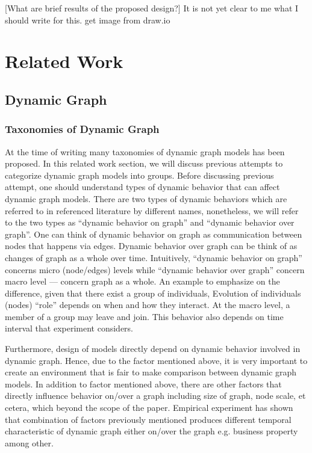 \documentclass{IEEEtran}
\begin{document}
[What are brief results of the proposed design?] It is not yet clear to me what I should write for this.
get image from draw.io


\section{Related Work}
\label{sec:orga9ab0d5}
\subsection{Dynamic Graph}
\label{sec:orgc18dde4}
\subsubsection{Taxonomies of Dynamic Graph}
\label{taxonomies of dynamic graph}
At the time of writing many taxonomies of dynamic graph models has been proposed.
In this related work section, we will discuss previous attempts to categorize dynamic graph models into groups. Before discussing previous attempt, one should understand types of dynamic behavior that can affect dynamic graph models. There are two types of dynamic behaviors which are referred to in referenced literature by different names, nonetheless, we will refer to the two types as ``dynamic behavior on graph'' and ``dynamic behavior over graph''. One can think of dynamic behavior on graph as communication between nodes that happens via edges. Dynamic  behavior over graph can be think of as changes of graph as a whole over time. Intuitively, ``dynamic behavior on graph'' concerns micro (node/edges) levels while ``dynamic behavior over graph'' concern macro level --- concern graph as a whole. An example to emphasize on the difference, given that there exist a group of individuals, Evolution of individuals (nodes) ``role'' depends on when and how they interact. At the macro level, a member of a group may leave and join. This behavior also depends on time interval that experiment considers.

Furthermore, design of models directly depend on dynamic behavior involved in dynamic graph. Hence, due to the factor mentioned above, it is very important to create an environment that is fair to make comparison between dynamic graph models. In addition to factor mentioned above, there are other factors that directly influence behavior on/over a graph including size of graph, node scale, et cetera, which beyond the scope of the paper. Empirical experiment has shown that combination of factors previously mentioned produces different temporal characteristic of dynamic graph either on/over the graph e.g. business property \cite{holme2012temporal} among other.
\end{document}
